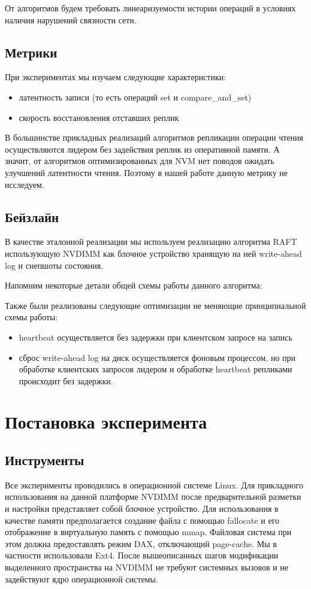 \documentclass[pdftex,ptm,12pt,a4paper]{report}
\theoremstyle{definition}
\begin{document}
От алгоритмов будем требовать линеаризуемости \cite{linearizability} истории операций в условиях наличия нарушений связности сети.

\section{Метрики}
При экспериментах мы изучаем следующие характеристики:
\begin{itemize}
    \item латентность записи (то есть операций set и compare\_and\_set)
    \item скорость восстановления отставших реплик
\end{itemize}

В большинстве прикладных реализаций алгоритмов репликации операции чтения осуществляются лидером без задействия реплик из оперативной памяти.
А значит, от алгоритмов оптимизированных для NVM нет поводов ожидать улучшений латентности чтения. Поэтому в нашей работе данную метрику не исследуем.

\section{Бейзлайн}
В качестве эталонной реализации мы используем реализацию алгоритма RAFT \cite{raftpaper} использующую NVDIMM как блочное устройство
хранящую на ней write-ahead log и снепшоты состояния.

Напомним некоторые детали общей схемы работы данного алгоритма:


Также были реализованы следующие оптимизации не меняющие принципиальной схемы работы:
\begin{itemize}
\item heartbeat осуществляется без задержки при клиентском запросе на запись
\item сброс write-ahead log на диск осуществляется фоновым процессом, но при обработке клиентских запросов лидером и обработке heartbeat репликами происходит без задержки.
\end{itemize}

\chapter{Постановка эксперимента}
\section{Инструменты}

Все эксперименты проводились в операционной системе Linux.  Для прикладного использования на данной платформе NVDIMM
после предварительной разметки и настройки представляет собой блочное устройство. Для использования в качестве памяти предполагается создание файла с помощью fallocate
и его отображение в виртуальную память с помощью mmap. Файловая система при этом должна предоставлять режим DAX, отключающий page-cache. Мы в частности использовали Ext4.
После вышеописанных шагов модификации выделенного пространства на NVDIMM не требуют системных вызовов и не задействуют ядро операционной системы.
\end{document}
